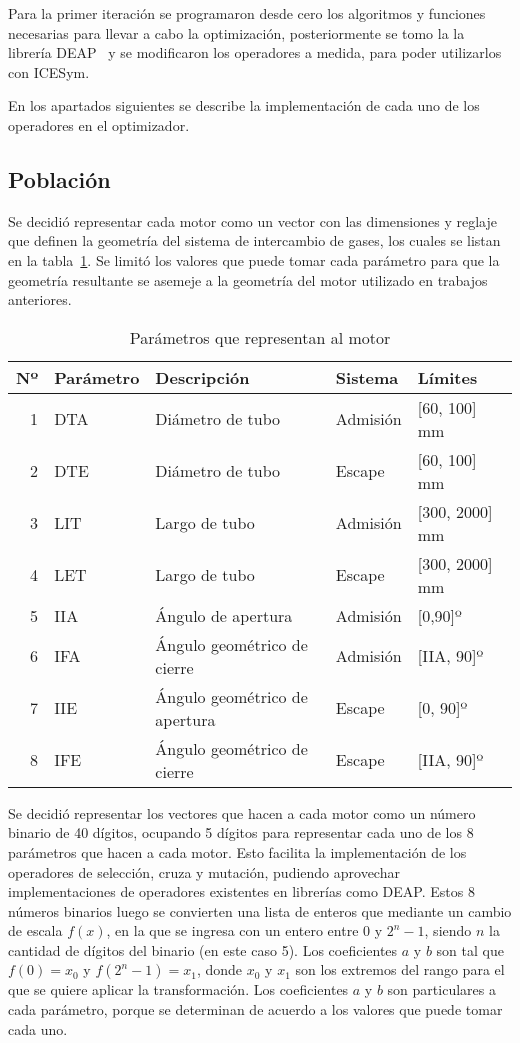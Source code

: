 Para la primer iteración se programaron desde cero los algoritmos y funciones
necesarias para llevar a cabo la optimización,  posteriormente se tomo la la
librería DEAP~\parencite{DEAP_JMLR2012} y se modificaron los operadores a medida,
para poder utilizarlos con ICESym.

En los apartados siguientes se describe la implementación de cada uno de los
operadores en el optimizador.

\subsection{Población}
%
Se decidió representar cada motor como un vector con las dimensiones y reglaje
que definen la geometría del sistema de intercambio de gases, los cuales se
listan en la tabla~\ref{tab:param_motor}.
%
Se limitó los valores que puede tomar cada parámetro para que la geometría
resultante se asemeje a la geometría del motor utilizado en trabajos anteriores.


\begin{table}[ht]
  \centering
  \begin{tabular}{rllll} \toprule
    Nº & Parámetro & Descripción & Sistema & Límites \\ \midrule
    1 & DTA & Diámetro de tubo & Admisión & [60, 100] mm \\
    2 & DTE & Diámetro de tubo & Escape & [60, 100] mm\\
    3 & LIT & Largo de tubo & Admisión & [300, 2000] mm\\
    4 & LET & Largo de tubo & Escape & [300, 2000] mm\\
    5 & IIA & Ángulo de apertura & Admisión & [0,90]º \\
    6 & IFA & Ángulo geométrico de cierre & Admisión & [IIA, 90]º \\
    7 & IIE & Ángulo geométrico de apertura & Escape & [0, 90]º \\
    8 & IFE & Ángulo geométrico de cierre & Escape & [IIA, 90]º \\ \bottomrule
  \end{tabular}
  \caption{Parámetros que representan al motor}\label{tab:param_motor}
\end{table}


Se decidió representar los vectores que hacen a cada motor como un número
binario de 40 dígitos, ocupando 5 dígitos para representar cada uno de los 8
parámetros que hacen a cada motor.
%
Esto facilita la implementación de los operadores de selección, cruza y
mutación, pudiendo aprovechar implementaciones de operadores existentes en
librerías como DEAP.
%
Estos 8 números binarios luego se convierten una lista de enteros que mediante
un cambio de escala $f(x)$, en la que se ingresa con un entero entre 0 y
$2^{n}-1$, siendo $n$ la cantidad de dígitos del binario (en este caso 5).
%
Los coeficientes $a$ y $b$ son tal que $f(0)=x_{0}$ y $f(2^{n}-1) = x_{1}$,
donde $x_{0}$ y $x_{1}$ son los extremos del rango para el que se quiere aplicar
la transformación.
%
Los coeficientes $a$ y $b$ son particulares a cada parámetro, porque se
determinan de acuerdo a los valores que puede tomar cada uno.

